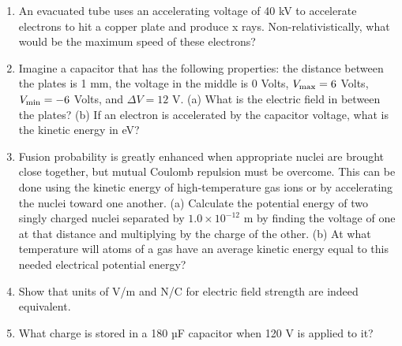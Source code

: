 \documentclass{article}
\begin{document}
\begin{enumerate}
\item An evacuated tube uses an accelerating voltage of 40 kV to accelerate electrons to hit a copper plate and produce x rays. Non-relativistically, what would be the maximum speed of these electrons? \\ \vspace{4cm}
\item Imagine a capacitor that has the following properties: the distance between the plates is 1 mm, the voltage in the middle is 0 Volts, $V_{\rm max} = 6$ Volts, $V_{\rm min} = -6$ Volts, and $\Delta V = 12$ V.  (a) What is the electric field in between the plates? (b) If an electron is accelerated by the capacitor voltage, what is the kinetic energy in eV? \\ \vspace{2cm}
\item Fusion probability is greatly enhanced when appropriate nuclei are brought close together, but mutual Coulomb repulsion must be overcome. This can be done using the kinetic energy of high-temperature gas ions or by accelerating the nuclei toward one another. (a) Calculate the potential energy of two singly charged nuclei separated by $1.0 \times 10^{-12}$ m by finding the voltage of one at that distance and multiplying by the charge of the other. (b) At what temperature will atoms of a gas have an average kinetic energy equal to this needed electrical potential energy? \\ \vspace{4cm}
\item Show that units of V/m and N/C for electric field strength are indeed equivalent. \\ \vspace{2cm}
\item What charge is stored in a 180 µF capacitor when 120 V is applied to it? \\ \vspace{2cm}
\end{enumerate}
\end{document}
